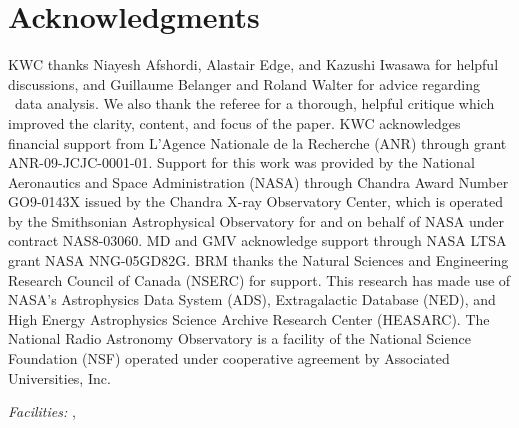 \documentclass[useAMS,usenatbib]{mn2e}
\begin{document}
\section*{Acknowledgments}

KWC thanks Niayesh Afshordi, Alastair Edge, and Kazushi Iwasawa for
helpful discussions, and Guillaume Belanger and Roland Walter for
advice regarding \integral\ data analysis. We also thank the referee
for a thorough, helpful critique which improved the clarity, content,
and focus of the paper. KWC acknowledges financial support from
L'Agence Nationale de la Recherche (ANR) through grant
ANR-09-JCJC-0001-01. Support for this work was provided by the
National Aeronautics and Space Administration (NASA) through Chandra
Award Number GO9-0143X issued by the Chandra X-ray Observatory Center,
which is operated by the Smithsonian Astrophysical Observatory for and
on behalf of NASA under contract NAS8-03060. MD and GMV acknowledge
support through NASA LTSA grant NASA NNG-05GD82G. BRM thanks the
Natural Sciences and Engineering Research Council of Canada (NSERC)
for support. This research has made use of NASA's Astrophysics Data
System (ADS), Extragalactic Database (NED), and High Energy
Astrophysics Science Archive Research Center (HEASARC). The National
Radio Astronomy Observatory is a facility of the National Science
Foundation (NSF) operated under cooperative agreement by Associated
Universities, Inc.

{\it Facilities:} , 






\clearpage
\onecolumn







\label{lastpage}
\end{document}
